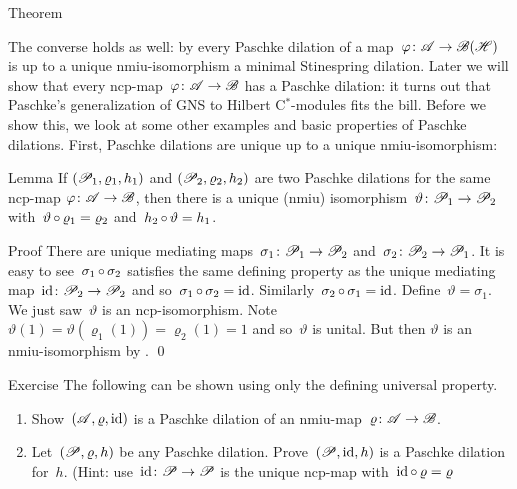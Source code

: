 \documentclass[b]{subfiles}
\begin{document}
\begin{parsec}
\begin{point}{Theorem}
\begin{point}%
The converse holds as well:
    by 
    every Paschke dilation of a map~$\varphi \colon \mathscr{A} \to \mathscr{B}(\mathscr{H})$
    is up to a unique nmiu-isomorphism a minimal Stinespring dilation.
Later we will show that
    every ncp-map~$\varphi\colon \mathscr{A} \to \mathscr{B}$
    has a Paschke dilation:
    it turns out that Paschke's generalization of
    GNS to Hilbert C$^*$-modules fits the bill.
Before we show this,
    we look at some other examples and basic properties
        of Paschke dilations.
First, Paschke dilations are unique up to a unique nmiu-isomorphism:
\par
\end{point}
\end{point}
\begin{point}{Lemma}%
If $(\mathscr{P}_1, \varrho_1, h_1)$
and $(\mathscr{P}_2, \varrho_2, h_2)$
    are two Paschke dilations for 
    the same ncp-map $\varphi\colon \mathscr{A} \to \mathscr{B}$,
    then there is a unique (nmiu)
    isomorphism~$\vartheta \colon \mathscr{P}_1 \to \mathscr{P}_2$
    with~$\vartheta \mathop{\circ} \varrho_1 = \varrho_2$
    and~$h_2 \mathop{\circ} \vartheta = h_1$.
\begin{point}{Proof}%
There are unique mediating maps~$\sigma_1\colon \mathscr{P}_1 \to \mathscr{P}_2$
and~$\sigma_2 \colon \mathscr{P}_2 \to \mathscr{P}_1$.
It is easy to see~$\sigma_1 \mathop{\circ} \sigma_2$
satisfies the same defining property
as the unique mediating map~$\operatorname{id}\colon \mathscr{P}_2 \to \mathscr{P}_2$
and so~$\sigma_1 \mathop{\circ} \sigma_2 = \operatorname{id}$.
Similarly~$\sigma_2 \mathop{\circ} \sigma_1 = \operatorname{id}$.
Define~$\vartheta = \sigma_1$.
We just saw~$\vartheta$ is an ncp-isomorphism.
Note~$\vartheta(1) = \vartheta(\varrho_1(1)) = \varrho_2(1) = 1$
and so~$\vartheta$ is unital.
But then
    $\vartheta$ is an nmiu-isomorphism
    by . \qed
\par
\end{point}
\end{point}
\begin{point}{Exercise}%
The following can be shown using only the defining universal property.
\begin{enumerate}
\item
Show~$(\mathscr{A},\varrho,\operatorname{id})$ is a Paschke dilation of
    an nmiu-map~$\varrho\colon \mathscr{A} \to \mathscr{B}$.
\item
Let~$(\mathscr{P}, \varrho, h)$ be any Paschke dilation.
Prove~$(\mathscr{P}, \operatorname{id}, h)$ is a Paschke dilation for~$h$.
(Hint: use~$\operatorname{id}\colon \mathscr{P} \to \mathscr{P}$
is the unique ncp-map with~$\operatorname{id} \mathop{\circ} \varrho = \varrho$

\end{enumerate}
\end{point}
\end{parsec}
\end{document}
